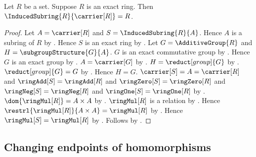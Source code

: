 \begin{theorem}\label{full_induced_subring_eq}
    Let $R$ be a set.
    Suppose $R$ is an exact ring.
    Then $\InducedSubring{R}{\carrier[R]}=R$.
\end{theorem}
\begin{proof}
    Let $A=\carrier[R]$ and $S=\InducedSubring{R}{A}$.
    Hence $A$ is a subring of $R$ by .
    Hence $S$ is an exact ring by .
    Let $G=\AdditiveGroup{R}$ and $H=\subgroupStructure{G}{A}$.
    $G$ is an exact commutative group by
        .
    Hence $G$ is an exact group by .
    $A=\carrier[G]$ by .
    $H=\reduct[group]{G}$ by
        .
    $\reduct[group]{G}=G$ by .
    Hence $H=G$.
    $\carrier[S]=A=\carrier[R]$ and
        $\ringAdd[S]=\ringAdd[R]$ and
        $\ringZero[S]=\ringZero[R]$ and
        $\ringNeg[S]=\ringNeg[R]$ and
        $\ringOne[S]=\ringOne[R]$ by
        .
    $\dom{\ringMul[R]}=A\times A$ by
        .
    $\ringMul[R]$ is a relation by
        .
    Hence $\restrl{\ringMul[R]}{A\times A}=\ringMul[R]$ by
        .
    Hence $\ringMul[S]=\ringMul[R]$ by
        .
    Follows by .
\end{proof}

\subsection{Changing endpoints of homomorphisms}

